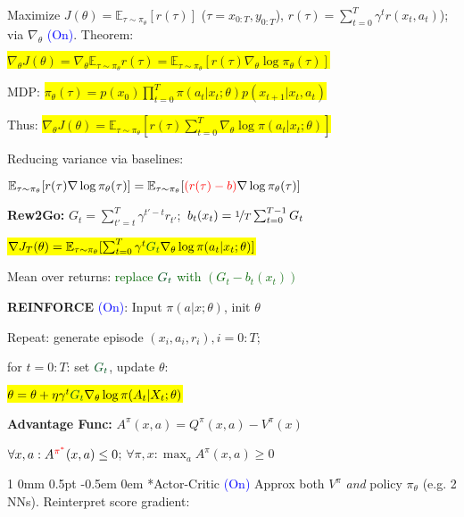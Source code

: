 \documentclass[11pt,landscape,a4paper,fleqn]{article}
\makeatletter
\newcommand*{\rsection}{%
	\@startsection{section}%
	{1}%
	{0mm}%
	{0.5pt}%
	{-0.5em \@plus 0em}
	{\color{myorange}\sffamily\small\bfseries}}
\newcommand{\mhl}[1]{\setlength{\fboxsep}{0pt}\colorbox{yellow}{#1}}
\makeatother
\begin{document}
\begin{multicols*}{4}
Maximize $J(\theta) = \mathbb{E}_{\tau \sim \pi_\theta} [r(\tau)]$ ($\tau = x_{0:T}, y_{0:T}$), $r(\tau) = \sum_{t=0}^{T} \gamma^t r(x_t, a_t)$); via $\nabla_\theta$ {\fontsize{9}{6}\selectfont \textcolor{blue}{(On)}}. Theorem:

\mhl{$\nabla_\theta J(\theta) = \nabla_\theta \mathbb{E}_{\tau \sim \pi_\theta} r(\tau) = \mathbb{E}_{\tau \sim \pi_\theta} [r(\tau) \nabla_\theta \log \pi_\theta(\tau)]$}

MDP: \mhl{$\pi_\theta(\tau) = p(x_0) \prod_{t=0}^{T} \pi(a_t | x_t; \theta) p(x_{t+1} | x_t, a_t)$}

Thus: \mhl{$\nabla_\theta J(\theta) = \mathbb{E}_{\tau \sim \pi_\theta} [r(\tau) \sum_{t=0}^{T} \nabla_\theta \log \pi(a_t | x_t; \theta)]$}

Reducing variance via baselines:

\mbox{\fontsize{9.4}{6}\selectfont $\mathbb{E}_{\tau \sim \pi_\theta} [r(\tau) \nabla \log \pi_\theta(\tau)] = \mathbb{E}_{\tau \sim \pi_\theta} [\textcolor{red}{(r(\tau) - b)} \nabla \log \pi_\theta(\tau)]$}

\textbf{Rew2Go:} \mbox{$G_t = \sum_{t' = t}^{T} \gamma^{t' - t} r_{t'}$; $b_t(x_t) = \nicefrac{1}{T} \sum_{t=0}^{T-1} G_t$}

\mhl{$\nabla J_T(\theta) = \mathbb{E}_{\tau \sim \pi_\theta} [\sum_{t=0}^T \gamma^t \textcolor{darkgreen}{G_t} \nabla_\theta \log \pi(a_t | x_t; \theta)]$}

Mean over returns: \textcolor{darkgreen}{replace $\textcolor{darkgreen}{G_t}$ with $(G_t - b_t(x_t))$}



\textbf{REINFORCE} \textcolor{blue}{(On)}: Input $\pi(a | x; \theta)$, init $\theta$

Repeat: generate episode $(x_i, a_i, r_i), i=0:T$;

for $t=0:T$: set $\textcolor{darkgreen}{G_t}$, update $\theta$:

\mhl{$\theta = \theta + \eta \gamma^t \textcolor{darkgreen}{G_t} \nabla_\theta \log \pi(A_t | X_t; \theta)$}




\textbf{Advantage Func:} {\fontsize{9.8}{6}\selectfont $A^\pi(x,a) = Q^\pi(x,a) - V^\pi(x)$}

$\forall x,a: A^{\textcolor{red}{\pi^*}}(x,a) \leq 0$; $\forall \pi,x: \max_a A^\pi(x,a) \geq 0$



\rsection*{Actor-Critic} \textcolor{blue}{(On)} Approx both $V^\pi$ \textit{and} policy $\pi_\theta$ (e.g. 2 NNs). Reinterpret score gradient:


\end{multicols*}
\end{document}
